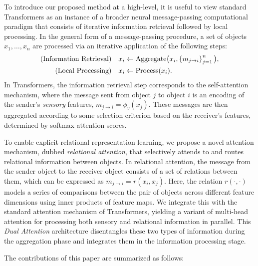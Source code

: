 To introduce our proposed method at a high-level, it is useful to view standard Transformers as an instance of a broader neural message-passing computational paradigm that consists of iterative information retrieval followed by local processing. In the general form of a message-passing procedure, a set of objects $x_1,\ldots, x_n$ are processed via an iterative application of the following steps:
\begin{equation}\label{eq:intro_message_passing}
  \begin{split}
    \text{(Information Retrieval)} \quad x_i &\gets \mathrm{Aggregate}\big(x_i, \left\{m_{j \to i}\right\}_{j=1}^{n}\big), \\
    \text{(Local Processing)} \quad x_i &\gets \mathrm{Process}(x_i).
  \end{split}
\end{equation}
In Transformers, the information retrieval step corresponds to the self-attention mechanism, where the message sent from object $j$ to object $i$ is an encoding of the sender's \textit{sensory} features, $m_{j \to i} = \phi_v(x_j)$. These messages are then aggregated according to some selection criterion based on the receiver's features, determined by softmax attention scores.

To enable explicit relational representation learning, we propose a novel attention mechanism, dubbed \textit{relational attention}, that selectively attends to and routes relational information between objects. In relational attention, the message from the sender object to the receiver object consists of a set of relations between them, which can be expressed as $m_{j \to i} = r(x_i, x_j)$. Here, the relation $r(\cdot, \cdot)$ models a series of comparisons between the pair of objects across different feature dimensions using inner products of feature maps. We integrate this with the standard attention mechanism of Transformers, yielding a variant of multi-head attention for processing both sensory and relational information in parallel. This \textit{Dual Attention} architecture disentangles these two types of information during the aggregation phase and integrates them in the information processing stage.

The contributions of this paper are summarized as follows:

